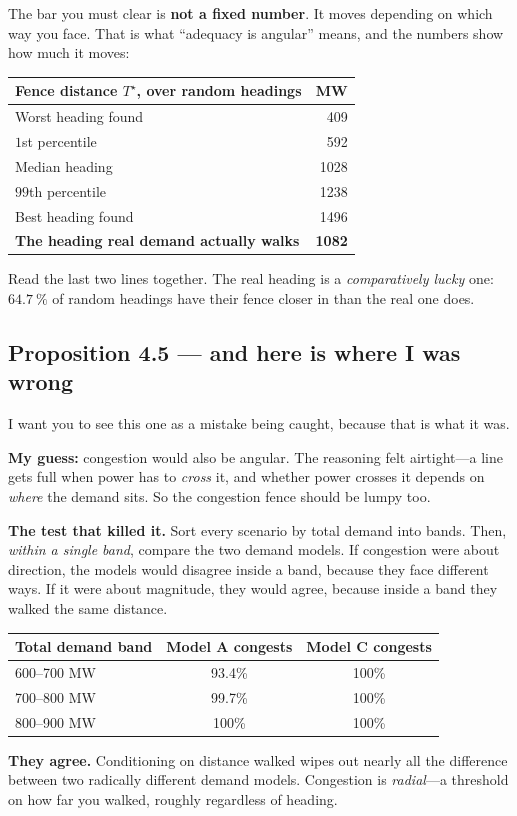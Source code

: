 \documentclass[11pt,a4paper]{article}
\begin{document}
The bar you must clear is \textbf{not a fixed number}. It moves depending on
which way you face. That is what ``adequacy is angular'' means, and the numbers
show how much it moves:

\begin{center}
\small
\begin{tabular}{@{}lr@{}}
\toprule
\textbf{Fence distance $T^\star$, over random headings} & \textbf{MW} \\
\midrule
Worst heading found & 409 \\
$1$st percentile & 592 \\
Median heading & 1028 \\
$99$th percentile & 1238 \\
Best heading found & 1496 \\
\midrule
\textbf{The heading real demand actually walks} & \textbf{1082} \\
\bottomrule
\end{tabular}
\end{center}

Read the last two lines together. The real heading is a \emph{comparatively
lucky} one: $\SI{64.7}{\percent}$ of random headings have their fence closer in
than the real one does.

\subsection{Proposition 4.5 --- and here is where I was wrong}

\begin{watch}
I want you to see this one as a mistake being caught, because that is what it
was.

\textbf{My guess:} congestion would also be angular. The reasoning felt
airtight---a line gets full when power has to \emph{cross} it, and whether power
crosses it depends on \emph{where} the demand sits. So the congestion fence
should be lumpy too.

\textbf{The test that killed it.} Sort every scenario by total demand into
bands. Then, \emph{within a single band}, compare the two demand models. If
congestion were about direction, the models would disagree inside a band,
because they face different ways. If it were about magnitude, they would agree,
because inside a band they walked the same distance.

\smallskip
\begin{tabular}{@{}lcc@{}}
\toprule
Total demand band & Model A congests & Model C congests \\
\midrule
600--700 MW & 93.4\% & 100\% \\
700--800 MW & 99.7\% & 100\% \\
800--900 MW & 100\%\phantom{.0} & 100\% \\
\bottomrule
\end{tabular}

\smallskip
\textbf{They agree.} Conditioning on distance walked wipes out nearly all the
difference between two radically different demand models. Congestion is
\emph{radial}---a threshold on how far you walked, roughly regardless of
heading.
\end{watch}
\end{document}
